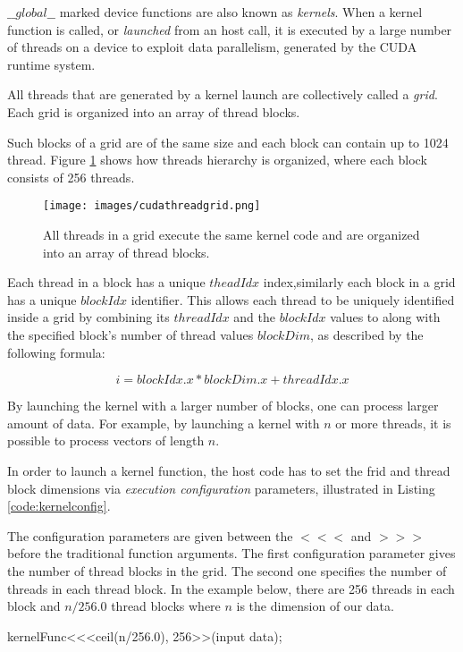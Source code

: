 \documentclass[12pt,a4paper]{extarticle}
\newcommand{\linespace}{\vspace{8pt}}
\begin{document}
$\_\_global\_\_$ marked device functions are also known as \textit{kernels}. When a kernel function is called, or \textit{launched} from an host call, it is executed by a large number of threads on a device to exploit data parallelism, generated by the CUDA runtime system.

All threads that are generated by a kernel launch are collectively called a \textit{grid}. Each grid is organized into an array of thread blocks.

Such blocks of a grid are of the same size and each block can contain up to 1024 thread. Figure \ref{fig:cudagridblock} shows how threads hierarchy is organized, where each block consists of 256 threads.
\begin{figure}[hbtp]
\centering
\texttt{[image: images/cudathreadgrid.png]}
\caption{All threads in a grid execute the same kernel code and are organized into an array of thread blocks.}
\label{fig:cudagridblock}
\end{figure}


Each thread in a block has a unique $theadIdx$ index,similarly each block in a grid has a unique $blockIdx$ identifier. This allows each thread to be uniquely identified inside a grid by combining its $threadIdx$ and the $blockIdx$ values to along with the specified block's number of thread values $blockDim$, as described by the following formula:

\[
i = blockIdx.x * blockDim.x + threadIdx.x
\]

By launching the kernel with a larger number of blocks, one can process larger amount of data. For example, by launching a kernel with $n$ or more threads, it is possible to process vectors of length $n$.
\linespace

In order to launch a kernel function, the host code has to set the frid and thread block dimensions via \textit{execution configuration} parameters, illustrated in Listing \ref{code:kernelconfig}.

The configuration parameters are given between the $<<<$ and $>>>$ before the traditional function arguments. The first configuration parameter gives the number of thread blocks in the grid. The second one specifies the number of threads in each thread block. In the example below, there are 256 threads in each block and $n/256.0$ thread blocks where $n$ is the dimension of our data.

\begin{cpp}[caption={A kernel function launch statement.},label=code:kernelconfig]
kernelFunc<<<ceil(n/256.0), 256>>(input data);
\end{cpp}
\end{document}
